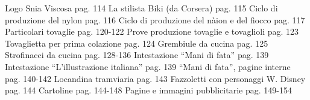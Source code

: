 Logo Snia Viscosa                                                          pag. 114
La stilista Biki (da Corsera)                                          pag. 115
Ciclo di produzione del nylon                                        pag. 116
Ciclo di produzione del nàion e del fiocco                     pag. 117
Particolari tovaglie                                                 pag. 120-122
Prove produzione tovaglie e tovaglioli                         pag. 123
Tovaglietta per prima colazione                                   pag. 124
Grembiule da cucina                                                      pag. 125
Strofinacci da cucina                                             pag. 128-136
Intestazione “Mani di fata”                                          pag. 139
Intestazione “L’illustrazione italiana”                         pag. 139
“Mani di fata”, pagine interne                               pag. 140-142
Locandina tramviaria                                                    pag. 143
Fazzoletti con personaggi W. Disney                           pag. 144
Cartoline                                                                  pag. 144-148
Pagine e immagini pubblicitarie                            pag. 149-154


\clearpage
